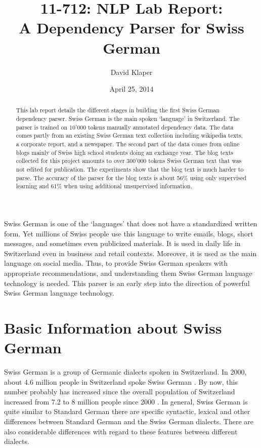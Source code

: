 \documentclass[11pt,letterpaper, covington]{article}
\title{11-712:  NLP Lab Report: \\
A Dependency Parser for Swiss German}
\author{David Klaper}
\date{April 25, 2014}
\begin{document}
\maketitle
\begin{abstract}
This lab report details the different stages in building the first Swiss German dependency parser. Swiss German is the main spoken `language' in Switzerland. The parser is trained on 10'000 tokens manually annotated dependency data. The data comes partly from an existing Swiss German text collection including wikipedia texts, a corporate report, and a newspaper. The second part of the data comes from online blogs mainly of Swiss high school students doing an exchange year. The blog texts collected for this project amounts to over 300'000 tokens Swiss German text that was not edited for publication. The experiments show that the blog text is much harder to parse. The accuracy of the parser for the blog texts is about 56\% using only supervised learning and 61\% when using additional unsupervised information.
\end{abstract}

Swiss German is one of the `languages' that does not have a standardized written form. Yet millions of Swiss people use this language to write emails, blogs, short messages, and sometimes even publicized materials. It is used in daily life in Switzerland even in business and retail contexts. Moreover, it is used as the main language on social media. Thus, to provide Swiss German speakers with appropriate recommendations, and understanding them Swiss German language technology is needed. This parser is an early step into the direction of powerful Swiss German language technology.

\section{Basic Information about Swiss German}

Swiss German is a group of Germanic dialects spoken in Switzerland. In 2000, about 4.6 million people in Switzerland spoke Swiss German \citep{LGC13}. By now, this number probably has increased since the overall population of Switzerland increased from 7.2 to 8 million people since 2000 \citep{BFS13}. In general, Swiss German is quite similar to Standard German there are specific syntactic, lexical and other differences between Standard German and the Swiss German dialects. There are also considerable differences with regard to these features between different dialects. \citep{Scherrer11}
\end{document}
